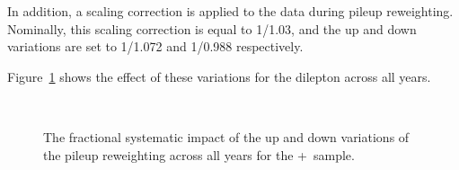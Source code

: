 In addition, a scaling correction is applied to the data during pileup reweighting. Nominally, this scaling correction is equal to 1/1.03, and the up and down variations are set to 1/1.072 and 1/0.988 respectively.

Figure~\ref{fig:PRWpTll} shows the effect of these variations for the dilepton \pt across all years.

\begin{figure}[h!]
  \centering
   \\
  \caption{The fractional systematic impact of the up and down variations of the pileup reweighting across all years for the \powheg+\pythia~sample.}
  \label{fig:PRWpTll}
\end{figure}

